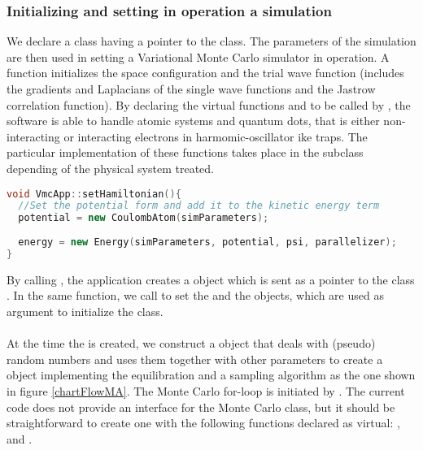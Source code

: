 \subsubsection{Initializing and setting in operation a simulation}
We declare a class  having a pointer to the  class. The parameters of the simulation are then used in setting a Variational Monte Carlo simulator in operation. A function  initializes the space configuration and the trial wave function (includes the gradients and Laplacians of the single wave functions and the Jastrow correlation function). By declaring the virtual functions  and  to be called by , the software is able to handle atomic systems and quantum dots, that is either non-interacting or interacting electrons in harmomic-oscillator ike traps. The particular implementation of these functions takes place in the subclass  depending of the physical system treated.
\begin{lstlisting}[language=c++]
void VmcApp::setHamiltonian(){
  //Set the potential form and add it to the kinetic energy term
  potential = new CoulombAtom(simParameters);
  
  energy = new Energy(simParameters, potential, psi, parallelizer);
}
\end{lstlisting}
By calling , the application creates a  object which is sent as a pointer to the class . In the same function, we call  to set the  and the  objects, which are used as argument to initialize the  class.\\ 
\\
At the time the  is created, we construct a  object that deals with (pseudo) random numbers and uses them together with other parameters to create a  object implementing the equilibration and a sampling algorithm as the one shown in figure \ref{chartFlowMA}. The Monte Carlo for-loop is initiated by . The current code does not provide an interface for the Monte Carlo class, but it should be straightforward to create one  with the following functions declared as virtual: ,  and .\\
